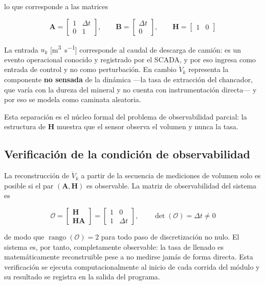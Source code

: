 lo que corresponde a las matrices

\begin{equation}
\mathbf{A} = \begin{bmatrix} 1 & \Delta t\\ 0 & 1\end{bmatrix},\qquad
\mathbf{B} = \begin{bmatrix} \Delta t\\ 0\end{bmatrix},\qquad
\mathbf{H} = \begin{bmatrix} 1 & 0\end{bmatrix}
\label{eq:matrices}
\end{equation}

La entrada $u_{k}$ [\si{\metre\cubed\per\second}] corresponde al caudal de
descarga de camión: es un evento operacional conocido y registrado por el SCADA,
y por eso ingresa como entrada de control y no como perturbación. En cambio
$\dot{V}_{k}$ representa la componente \textbf{no sensada} de la dinámica —la
tasa de extracción del chancador, que varía con la dureza del mineral y no
cuenta con instrumentación directa— y por eso se modela como caminata aleatoria.

Esta separación es el núcleo formal del problema de observabilidad parcial: la
estructura de $\mathbf{H}$ muestra que el sensor observa el volumen y nunca la
tasa.

\subsection{Verificación de la condición de observabilidad}

La reconstrucción de $\dot{V}_{k}$ a partir de la secuencia de mediciones de
volumen solo es posible si el par $(\mathbf{A}, \mathbf{H})$ es observable. La
matriz de observabilidad del sistema es

\begin{equation}
\mathcal{O} = \begin{bmatrix} \mathbf{H} \\ \mathbf{H}\mathbf{A}\end{bmatrix}
= \begin{bmatrix} 1 & 0\\ 1 & \Delta t\end{bmatrix},
\qquad \det(\mathcal{O}) = \Delta t \neq 0
\label{eq:observabilidad}
\end{equation}

de modo que $\operatorname{rango}(\mathcal{O}) = 2$ para todo paso de
discretización no nulo. El sistema es, por tanto, completamente observable: la
tasa de llenado es matemáticamente reconstruible pese a no medirse jamás de
forma directa. Esta verificación se ejecuta computacionalmente al inicio de cada
corrida del módulo y su resultado se registra en la salida del programa.

